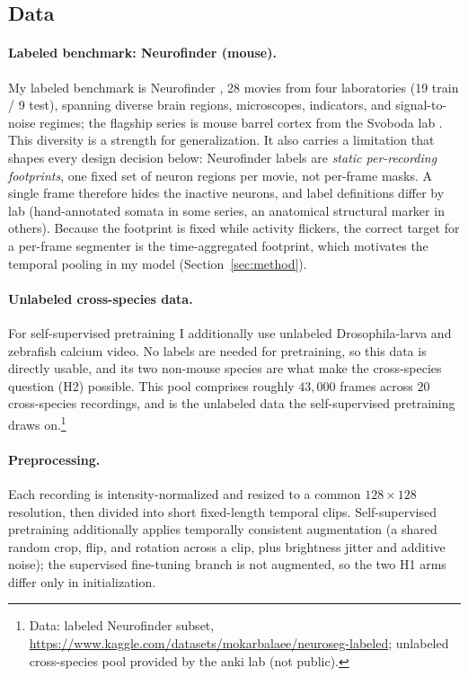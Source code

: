 \documentclass[twoside,11pt]{article}
\begin{document}
\subsection{Data}
\label{sec:data}

\paragraph{Labeled benchmark: Neurofinder (mouse).} My labeled benchmark is Neurofinder
\citep{neurofinder}, 28 movies from four laboratories (19 train / 9 test), spanning diverse brain
regions, microscopes, indicators, and signal-to-noise regimes; the flagship series is mouse barrel
cortex from the Svoboda lab \citep{peron2015barrel}. This diversity is a strength for
generalization. It also carries a limitation that shapes every design decision below: Neurofinder
labels are \emph{static per-recording footprints}, one fixed set of neuron regions per movie, not
per-frame masks. A single frame therefore hides the inactive neurons, and label definitions differ
by lab (hand-annotated somata in some series, an anatomical structural marker in others). Because
the footprint is fixed while activity flickers, the correct target for a per-frame segmenter is the
time-aggregated footprint, which motivates the temporal pooling in my model
(Section~\ref{sec:method}).

\paragraph{Unlabeled cross-species data.} For self-supervised pretraining I additionally use
unlabeled Drosophila-larva and zebrafish calcium video. No labels are needed for pretraining, so this
data is directly usable, and its two non-mouse species are what make the cross-species question (H2)
possible. This pool comprises roughly $43{,}000$ frames across $20$ cross-species
recordings, and is the unlabeled data the self-supervised pretraining draws
on.\footnote{Data: labeled Neurofinder subset, \url{https://www.kaggle.com/datasets/mokarbalaee/neuroseg-labeled};
unlabeled cross-species pool provided by the anki lab (not public).}

\paragraph{Preprocessing.} Each recording is intensity-normalized and resized to a common
$128\times128$ resolution, then divided into short fixed-length temporal clips. Self-supervised
pretraining additionally applies temporally consistent augmentation (a shared random crop, flip, and
rotation across a clip, plus brightness jitter and additive noise); the supervised fine-tuning branch
is not augmented, so the two H1 arms differ only in initialization.
\end{document}

